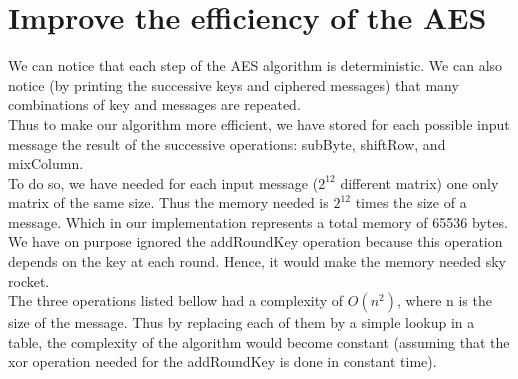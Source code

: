 \documentclass[12pt]{article} %
\begin{document}
\section{Improve the efficiency of the AES}
We can notice that each step of the AES algorithm is deterministic.   We can also notice (by printing the successive keys and ciphered messages) that many combinations of key and messages are repeated.\\
Thus to make our algorithm more efficient, we have stored for each possible input message the result of the successive operations: subByte, shiftRow, and mixColumn.\\
To do so, we have needed for each input message ($2^{12}$ different matrix) one only matrix of the same size.   Thus the memory needed is $2^{12}$ times the size of a message.  Which in our implementation represents a total memory of 65536 bytes.\\

We have on purpose ignored the addRoundKey operation because this operation depends on the key at each round.  Hence, it would make the memory needed sky rocket.\\

The three operations listed bellow had a complexity of $O(n^2)$, where n is the size of the message.   Thus by replacing each of them by a simple lookup in a table, the complexity of the algorithm would become constant (assuming that the xor operation needed for the addRoundKey is done in constant time). 
\end{document}
